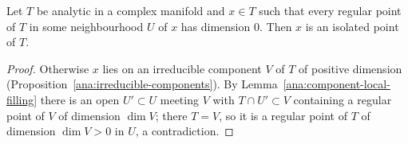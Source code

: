 \begin{lemma}
\label{rem:isolated-dim-zero}
\leanok
Let \(T\) be analytic in a complex manifold and \(x\in T\) such that every regular point of \(T\) in some neighbourhood \(U\) of \(x\) has dimension \(0\).
Then \(x\) is an isolated point of \(T\).
\end{lemma}
\begin{proof}
\leanok
Otherwise \(x\) lies on an irreducible component \(V\) of \(T\) of positive dimension (Proposition~\ref{ana:irreducible-components}). By
Lemma~\ref{ana:component-local-filling} there is an open \(U'\subset U\) meeting \(V\) with \(T\cap U'\subset V\) containing a regular point of \(V\) of
dimension \(\dim V\); there \(T=V\), so it is a regular point of \(T\) of dimension \(\dim V>0\) in \(U\), a contradiction.
\end{proof}

